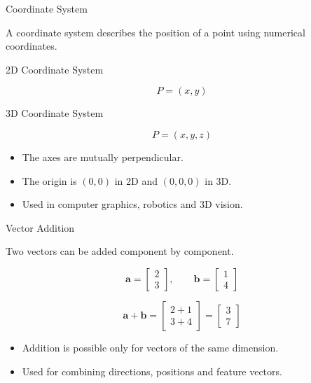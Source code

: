 \documentclass[aspectratio=169]{beamer}
\begin{document}
\begin{frame}{Coordinate System}
\small

A coordinate system describes the position of a point using numerical coordinates.

\begin{block}{2D Coordinate System}

$$
P=(x,y)
$$

\end{block}

\begin{block}{3D Coordinate System}

$$
P=(x,y,z)
$$

\end{block}

\begin{itemize}
\item The axes are mutually perpendicular.
\item The origin is $(0,0)$ in 2D and $(0,0,0)$ in 3D.
\item Used in computer graphics, robotics and 3D vision.
\end{itemize}

\end{frame}

\begin{frame}{Vector Addition}
\small

Two vectors can be added component by component.

$$
\mathbf{a}=
\begin{bmatrix}
2\\
3
\end{bmatrix},
\qquad
\mathbf{b}=
\begin{bmatrix}
1\\
4
\end{bmatrix}
$$

$$
\mathbf{a}+\mathbf{b}
=
\begin{bmatrix}
2+1\\
3+4
\end{bmatrix}
=
\begin{bmatrix}
3\\
7
\end{bmatrix}
$$

\begin{itemize}
\item Addition is possible only for vectors of the same dimension.
\item Used for combining directions, positions and feature vectors.
\end{itemize}

\end{frame}
\end{document}
